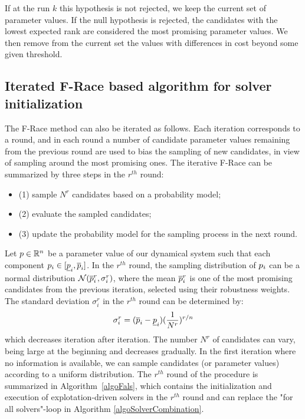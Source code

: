 If at the run $k$ this hypothesis is not rejected, we keep the current set of parameter values. If the null hypothesis is rejected, the candidates with the lowest expected rank are considered the most promising parameter values. We then remove from the current set  the values with differences in cost beyond some given threshold.  
 
 \subsection{Iterated F-Race based algorithm for solver initialization}
The F-Race method can also be iterated as follows. Each iteration corresponds to a round, and in each round a number of candidate parameter values remaining from the previous round are used to bias the sampling of new candidates, in view of sampling around the most promising ones. The iterative F-Race can be summarized by three steps in the $r^{th}$ round: 
\begin{itemize}
\item (1) sample $N^r$ candidates based on a probability model; 
\item (2) evaluate the sampled candidates; 
\item (3) update the probability model for the sampling process in the next round.
\end{itemize}
Let $p \in \mathbb{R}^n$ be a parameter value of our dynamical system such that each component $p_i \in [\underline{p}_i, \overline{p}_i]$. In the $r^{th}$ round, the sampling distribution of $p_i$ can be a normal distribution $\mathcal{N}(\overline{p}^r_i, \sigma_i^r)$, where the mean $\overline{p}^r_i$ is one of the most promising candidates from the previous iteration, selected using their robustness weights. The standard deviation $\sigma_i^r$ in the $r^{th}$ round can be determined by: 
\begin{equation} \label{eq:sigma}
\sigma_i^r = (\overline{p}_i - \underline{p}_i) (\frac{1}{N^r})^{r/n}
\end{equation}
which decreases iteration after iteration. The number $N^r$ of candidates can vary, being large at the beginning and decreases gradually. In the first iteration where no information is available, we can sample candidates (or parameter values) according to a uniform distribution. The $r^{th}$ round of the procedure is summarized in Algorithm~\ref{algoFals}, which contains the initialization and execution of explotation-driven solvers in the $r^{th} $ round and can replace the "for all solvers"-loop in Algorithm \ref{algoSolverCombination}. 

